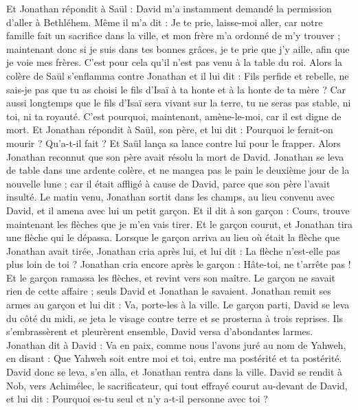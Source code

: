 \begin{multicols}{2}
Et Jonathan répondit à Saül : David m'a instamment demandé la permission d’aller à Bethléhem.
Même il m'a dit : Je te prie, laisse-moi aller, car notre famille fait un sacrifice dans la ville, et mon frère m'a ordonné de m'y trouver ; maintenant donc si je suis dans tes bonnes grâces, je te prie que j'y aille, afin que je voie mes frères. C'est pour cela qu'il n'est pas venu à la table du roi.
Alors la colère de Saül s'enflamma contre Jonathan et il lui dit : Fils perfide et rebelle, ne sais-je pas que tu as choisi le fils d'Isaï à ta honte et à la honte de ta mère ?
Car aussi longtemps que le fils d'Isaï sera vivant sur la terre, tu ne seras pas stable, ni toi, ni ta royauté. C'est pourquoi, maintenant, amène-le-moi, car il est digne de mort.
Et Jonathan répondit à Saül, son père, et lui dit : Pourquoi le ferait-on mourir ? Qu'a-t-il fait ?
Et Saül lança sa lance contre lui pour le frapper. Alors Jonathan reconnut que son père avait résolu la mort de David.
Jonathan se leva de table dans une ardente colère, et ne mangea pas le pain le deuxième jour de la nouvelle lune ; car il était affligé à cause de David, parce que son père l'avait insulté.
Le matin venu, Jonathan sortit dans les champs, au lieu convenu avec David, et il amena avec lui un petit garçon.
Et il dit à son garçon : Cours, trouve maintenant les flèches que je m'en vais tirer. Et le garçon courut, et Jonathan tira une flèche qui le dépassa.
Lorsque le garçon arriva au lieu où était la flèche que Jonathan avait tirée, Jonathan cria après lui, et lui dit : La flèche n'est-elle pas plus loin de toi ?
Jonathan cria encore après le garçon : Hâte-toi, ne t'arrête pas ! Et le garçon ramassa les flèches, et revint vers son maître.
Le garçon ne savait rien de cette affaire ; seuls David et Jonathan le savaient.
Jonathan remit ses armes au garçon et lui dit : Va, porte-les à la ville.
Le garçon parti, David se leva du côté du midi, se jeta le visage contre terre et se prosterna à trois reprises. Ils s’embrassèrent et pleurèrent ensemble, David versa d’abondantes larmes.
Jonathan dit à David : Va en paix, comme nous l’avons juré au nom de Yahweh, en disant : Que Yahweh soit entre moi et toi, entre ma postérité et ta postérité.
David donc se leva, s'en alla, et Jonathan rentra dans la ville.
\VerseOne{}David se rendit à Nob, vers Achimélec, le sacrificateur, qui tout effrayé courut au-devant de David, et lui dit : Pourquoi es-tu seul et n'y a-t-il personne avec toi ?

\end{multicols}
